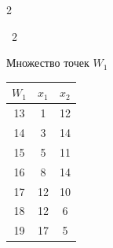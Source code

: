\begin{multicols}{2}
{\begin{center}
 


\noindent


{{\tablename~2}\ \ \small{


Множество точек $W_1$


}}


\end{center}}





{\small %


\begin{center}


\vspace*{3pt}


  \tabcolsep=17pt


   \begin{tabular}{|c|c|c|}


 \hline


$W_1$ & $x_1$ & $x_2$\\


\hline


13 & \hphantom{9}1&12\\


14 & \hphantom{9}3& 14\\


15 & \hphantom{9}5& 11\\


16 & \hphantom{9}8&14\\


17 & 12&10\\


18 & 12& \hphantom{9}6\\


19 &17& \hphantom{9}5\\


\hline


\end{tabular}


\end{center}


}







\vspace*{6pt}





{ \begin{center}  %



\end{center}}
\end{multicols}
